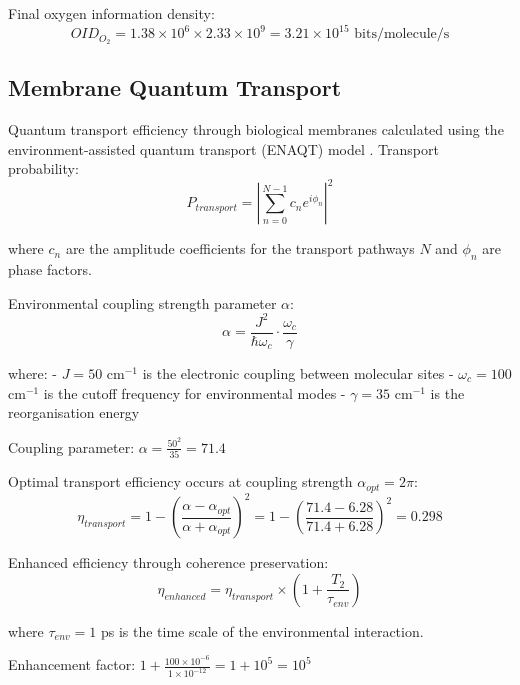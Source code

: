 \documentclass[12pt,a4paper]{article}
\begin{document}
Final oxygen information density:
\begin{equation}
OID_{O_2} = 1.38 \times 10^6 \times 2.33 \times 10^9 = 3.21 \times 10^{15} \text{ bits/molecule/s}
\end{equation}


\subsection{Membrane Quantum Transport}

Quantum transport efficiency through biological membranes calculated using the environment-assisted quantum transport (ENAQT) model \cite{mohseni2008environment}. Transport probability:
\begin{equation}
P_{transport} = \left|\sum_{n=0}^{N-1} c_n e^{i\phi_n}\right|^2
\end{equation}

where $c_n$ are the amplitude coefficients for the transport pathways $N$ and $\phi_n$ are phase factors.

Environmental coupling strength parameter $\alpha$:
\begin{equation}
\alpha = \frac{J^2}{\hbar \omega_c} \cdot \frac{\omega_c}{\gamma}
\end{equation}

where:
- $J = 50$ cm$^{-1}$ is the electronic coupling between molecular sites
- $\omega_c = 100$ cm$^{-1}$ is the cutoff frequency for environmental modes
- $\gamma = 35$ cm$^{-1}$ is the reorganisation energy

Coupling parameter: $\alpha = \frac{50^2}{35} = 71.4$

Optimal transport efficiency occurs at coupling strength $\alpha_{opt} = 2\pi$:
\begin{equation}
\eta_{transport} = 1 - \left(\frac{\alpha - \alpha_{opt}}{\alpha + \alpha_{opt}}\right)^2 = 1 - \left(\frac{71.4 - 6.28}{71.4 + 6.28}\right)^2 = 0.298
\end{equation}

Enhanced efficiency through coherence preservation:
\begin{equation}
\eta_{enhanced} = \eta_{transport} \times \left(1 + \frac{T_2}{\tau_{env}}\right)
\end{equation}

where $\tau_{env} = 1$ ps is the time scale of the environmental interaction.

Enhancement factor: $1 + \frac{100 \times 10^{-6}}{1 \times 10^{-12}} = 1 + 10^5 = 10^5$
\end{document}
